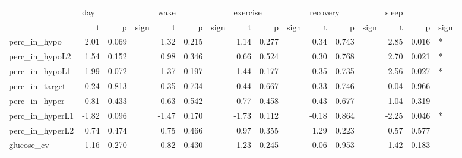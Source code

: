 \begin{tabular}{lrrlrrlrrlrrlrrl}
\toprule
{} & \multicolumn{3}{l}{day} & \multicolumn{3}{l}{wake} & \multicolumn{3}{l}{exercise} & \multicolumn{3}{l}{recovery} & \multicolumn{3}{l}{sleep} \\
{} &     t &      p & sign &     t &      p & sign &        t &      p & sign &        t &      p & sign &     t &      p & sign \\
\midrule
perc_in_hypo    &  2.01 &  0.069 &      &  1.32 &  0.215 &      &     1.14 &  0.277 &      &     0.34 &  0.743 &      &  2.85 &  0.016 &    * \\
perc_in_hypoL2  &  1.54 &  0.152 &      &  0.98 &  0.346 &      &     0.66 &  0.524 &      &     0.30 &  0.768 &      &  2.70 &  0.021 &    * \\
perc_in_hypoL1  &  1.99 &  0.072 &      &  1.37 &  0.197 &      &     1.44 &  0.177 &      &     0.35 &  0.735 &      &  2.56 &  0.027 &    * \\
perc_in_target  &  0.24 &  0.813 &      &  0.35 &  0.734 &      &     0.44 &  0.667 &      &    -0.33 &  0.746 &      & -0.04 &  0.966 &      \\
perc_in_hyper   & -0.81 &  0.433 &      & -0.63 &  0.542 &      &    -0.77 &  0.458 &      &     0.43 &  0.677 &      & -1.04 &  0.319 &      \\
perc_in_hyperL1 & -1.82 &  0.096 &      & -1.47 &  0.170 &      &    -1.73 &  0.112 &      &    -0.18 &  0.864 &      & -2.25 &  0.046 &    * \\
perc_in_hyperL2 &  0.74 &  0.474 &      &  0.75 &  0.466 &      &     0.97 &  0.355 &      &     1.29 &  0.223 &      &  0.57 &  0.577 &      \\
glucose_cv      &  1.16 &  0.270 &      &  0.82 &  0.430 &      &     1.23 &  0.245 &      &     0.06 &  0.953 &      &  1.42 &  0.183 &      \\
\bottomrule
\end{tabular}
